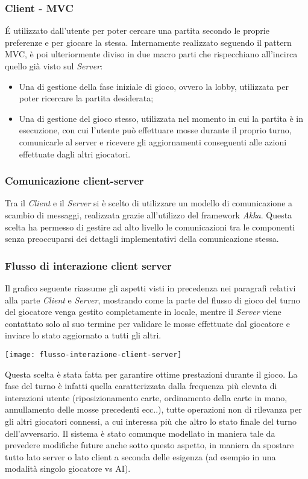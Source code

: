 \subsubsection{Client - MVC}
É utilizzato dall’utente per poter cercare una partita secondo le proprie preferenze e per giocare la stessa.
Internamente realizzato seguendo il pattern MVC, è poi ulteriormente diviso in due macro parti che rispecchiano all’incirca quello già visto sul \textit{Server}:
\begin{itemize}
    \item Una di gestione della fase iniziale di gioco, ovvero la lobby, utilizzata per poter ricercare la partita desiderata;
    \item Una di gestione del gioco stesso, utilizzata nel momento in cui la partita è in esecuzione, con cui l’utente può effettuare mosse durante il proprio turno, comunicarle al server e ricevere gli aggiornamenti conseguenti alle azioni effettuate dagli altri giocatori.
\end{itemize}
\subsubsection{Comunicazione client-server}
Tra il \textit{Client} e il \textit{Server} si è scelto di utilizzare un modello di comunicazione a scambio di messaggi, realizzata grazie all’utilizzo del framework \textit{Akka}.
Questa scelta ha permesso di gestire ad alto livello le comunicazioni tra le componenti senza preoccuparsi dei dettagli implementativi della comunicazione stessa.
\subsubsection[Flussi di interazione]{Flusso di interazione client server}
Il grafico seguente riassume gli aspetti visti in precedenza nei paragrafi relativi alla parte \textit{Client} e \textit{Server}, mostrando come la parte del flusso di gioco del turno del giocatore venga gestito completamente in locale, mentre il \textit{Server} viene contattato solo al suo termine per validare le mosse effettuate dal giocatore e inviare lo stato aggiornato a tutti gli altri.
\begin{center}
    \texttt{[image: flusso-interazione-client-server]}
\end{center}
Questa scelta è stata fatta per garantire ottime prestazioni durante il gioco.
La fase del turno è infatti quella caratterizzata dalla frequenza più elevata di interazioni utente (riposizionamento carte, ordinamento della carte in mano, annullamento delle mosse precedenti ecc..), tutte operazioni non di rilevanza per gli altri giocatori connessi, a cui interessa più che altro lo stato finale del turno dell’avversario.
Il sistema è stato comunque modellato in maniera tale da prevedere modifiche future anche sotto questo aspetto, in maniera da spostare tutto lato server o lato client a seconda delle esigenza (ad esempio in una modalità singolo giocatore vs AI).
\newpage